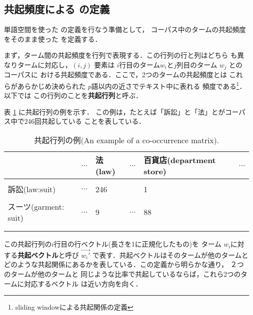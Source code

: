 \subsection{共起頻度による \ikd の定義}

  単語空間を使った \ikd の定義を行なう準備として，
コーパス中のタームの共起頻度をそのまま使った \ikd を定義する． 

  まず，ターム間の共起頻度を行列で表現する．この行列の行と列はどちら
も異なりタームに対応し，$(i, j)$
要素は $ i $行目のターム$ w_i $と$ j $列目のターム $ w_j $ とのコーパスに
おける共起頻度である．ここで，2つのタームの共起頻度とは
これらがあらかじめ決められた $p$語以内の近さでテキスト中に表れる
頻度である\footnote{sliding windowによる共起関係の定義}．以下では
この行列のことを{\bf 共起行列}と呼ぶ．

  表 \ref{tab.cooc} に共起行列の例を示す．
この例は，たとえば「訴訟」と「法」とがコーパス中で246回共起している
ことを表している．
 

\begin{table}[htb]
\caption{共起行列の例(An example of a co-occurrence matrix).}
\label{tab.cooc}
\begin{minipage}{\columnwidth}
\vspace{3mm}
\small
\begin{center}
\begin{tabular}{l||l|l|l|l|l}
 & $\ldots$  & 法(law) & $\ldots$ &  百貨店(department store)& $\ldots$\\\hline\hline
   &  &              & &          &  \\\hline
訴訟(law:suit) & $\ldots$ & 246 & & 1  &   \\\hline
   &  &              & &            &\\\hline
スーツ(garment:  suit)  &$\ldots$   & 9 &$\ldots$ & 88     &\\ \hline
&  &              & &            &\\\hline
   &  &              & &          &  \\
\end{tabular}  
\end{center}
\end{minipage}
\end{table}

  この共起行列の$i$行目の行ベクトル(長さを1に正規化したもの)を
ターム $w_i$に対する{\bf 共起ベクトル}と呼び $\vec{w_i'}$
で表す．共起ベクトルはそのタームが他のタームと
どのような共起関係にあるかを表している．この定義から明らかな通り，
２つのタームが他のタームと
同じような比率で共起しているならば，これら2つのタームに対応するベクトル
は近い方向を向く． 

